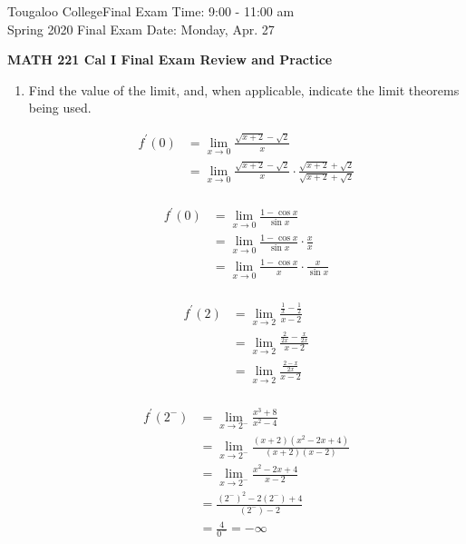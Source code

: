 \documentclass{exam}
\def\ans#1{\hfill \textcolor{lightgray}{#1}}
\begin{document}
\noindent
Tougaloo College\hfill  {\small Final Exam Time: 9:00 - 11:00 am}\\
Spring 2020 \hfill {\small Final Exam Date: Monday, Apr. 27}\\ 
\begin{center}
{\bf MATH 221 Cal I Final Exam Review and Practice} 
\end{center}

\medskip
\noindent

\medskip
\begin{enumerate}
\item
Find the value of the limit, and, when applicable, indicate the limit theorems being used.  %


\begin{minipage}{.5\linewidth}
\begin{align*}
 f^{\prime}(0)&= \lim_{x\to0} \frac{\sqrt{x+2}-\sqrt{2}}{x}\\
&= \lim_{x\to0} \frac{\sqrt{x+2}-\sqrt{2}}{x}\cdot \frac{\sqrt{x+2}+\sqrt{2}}{\sqrt{x+2}+\sqrt{2}}\\
\end{align*}
\end{minipage}%
\begin{minipage}{.5\linewidth}
\begin{align*}
f^{\prime}(0)&=  \lim_{x\to0} \frac{1-\cos{x}}{\sin{x}}\\
 &=\lim_{x\to0} \frac{1-\cos{x}}{\sin{x}}\cdot \frac{x}{x}\\
&=\lim_{x\to0} \frac{1-\cos{x}}{x}\cdot \frac{x}{\sin{x}}\\
\end{align*}
\end{minipage}
\vfill

\begin{minipage}{.5\linewidth}
\begin{align*}
 f^{\prime}(2)&=\lim_{x\to 2} \frac{\frac{1}{x}-\frac{1}{2}}{x-2}\\
&=\lim_{x\to 2} \frac{\frac{2}{2x}-\frac{x}{2x}}{x-2} \\
&=\lim_{x\to 2} \frac{\frac{2-x}{2x}}{x-2} \\
\end{align*}
\end{minipage}%
\begin{minipage}{.5\linewidth}
\begin{align*}
 f^{\prime}(2^{-})&=\lim_{x\to 2^{-}} \frac{x^{3}+8}{x^{2}-4}\\
&=\lim_{x\to 2^{-}} \frac{(x+2)(x^{2}-2x+4)}{(x+2)(x-2)}\\
&=\lim_{x\to 2^{-}} \frac{x^{2}-2x+4}{x-2}\\
&=\frac{(2^{-})^{2}-2(2^{-})+4}{(2^{-})-2}\\
&=\frac{4}{0^{-}}=-\infty
\end{align*}
\end{minipage}




\end{enumerate}
\end{document}
